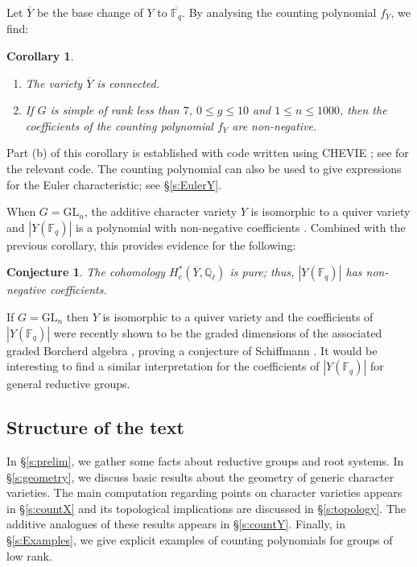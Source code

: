 \documentclass[12pt]{amsart}
\theoremstyle{plain}
\newtheorem{conj}[thm]{Conjecture}
\newtheorem{cor}[thm]{Corollary}
\theoremstyle{definition}
\theoremstyle{remark}
\newcommand{\bY}{{Y}}
\newcommand{\GL}{\mathrm{GL}}
\newcommand{\Fq}{\mathbb{F}_q}
\begin{document}
Let $\overline{Y}$ be the base change of $Y$ to $\overline{\Fq}$. By analysing the counting polynomial $f_Y$, we find: 

\begin{cor} \label{c:Y}
\begin{enumerate} 
\item[(a)] The variety $\overline{Y}$ is connected.  
\item[(b)] If $G$ is simple of rank less than $7$, $0\leq g\leq 10$ and $1\leq n\leq 1000$, then the coefficients of the counting polynomial $f_Y$ are non-negative.
\end{enumerate} 
\end{cor} 

 
Part (b) of this corollary is established with code written using CHEVIE \cite{GHLMP96,Michel15}; see \cite{Bailey} for the relevant code.
The counting polynomial can also be used to give expressions for the Euler characteristic; see \S \ref{s:EulerY}.

When $G=\GL_n$, the additive character variety $Y$ is isomorphic to a quiver variety and $|Y(\Fq)|$ is a polynomial with non-negative coefficients \cite{HLRV11}.  Combined with the previous corollary, this provides evidence for the following: 
 

\begin{conj} \label{c:purity}
The cohomology $H_c^*(\overline{\bY},\mathbb{Q}_\ell)$ is pure; thus, $|Y(\Fq)|$ has non-negative coefficients. 
\end{conj} 
 
 
 
 
If $G=\GL_n$ then $Y$ is isomorphic to a quiver variety and the coefficients of $|Y(\Fq)|$ were recently shown to be the graded dimensions of the associated graded Borcherd algebra \cite{Lucien}, proving a conjecture of Schiffmann \cite{Schiffmann18}. It would be interesting to find a similar interpretation for the coefficients of $|\bY(\Fq)|$ for general reductive groups.

 
 \subsection{Structure of the text} 
 In \S \ref{s:prelim}, we gather some facts about reductive groups and  root systems. In \S \ref{s:geometry}, we discuss basic results about the geometry of generic character varieties. The main computation regarding points on character varieties appears in \S \ref{s:countX} and its topological implications are discussed in \S \ref{s:topology}. The additive analogues of these results appears in \S \ref{s:countY}. Finally, in \S \ref{s:Examples}, we give explicit examples of counting polynomials for groups of low rank. 
\end{document}
